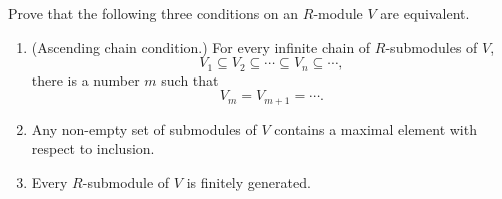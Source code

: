 \begin{exercise}
    Prove that the following three conditions on an $R$-module $V$ are equivalent.
    \begin{enumerate}
        \item \textup{(Ascending chain condition.)} For every infinite chain of $R$-submodules of $V$,
              \[
                  V_1\subseteq V_2\subseteq \cdots \subseteq V_n\subseteq\cdots,
              \]
              there is a number $m$ such that
              \[
                  V_m=V_{m+1}=\cdots.
              \]
        \item Any non-empty set of submodules of $V$ contains a maximal element with respect to inclusion.
        \item Every $R$-submodule of $V$ is finitely generated.
    \end{enumerate}
\end{exercise}

